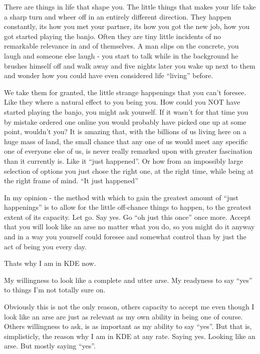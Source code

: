 

\noindent{}There are things in life that shape you. The little things that makes your life take a sharp turn and wheer off in an entirely different direction. 
They happen constantly, its how you met your partner, its how you got the new job, how you got started playing the banjo. Often they are tiny little incidents of no remarkable relevance in and of themselves. A man slips on the concrete, you laugh and someone else laugh - you start to talk while in the background he brushes himself off and walk away and five nights later you wake up next to them and wonder how you could have even considered life “living” before.

We take them for granted, the little strange happenings that you can’t foresee. Like they where a natural effect to you being you. How could you NOT have started playing the banjo, you might ask yourself. If it wasn’t for that time you by mistake ordered one online you would probably have picked one up at some point, wouldn’t you? 
It is amazing that, with the billions of us living here on a huge mass of land, the small chance that any one of us would meet any specific one of everyone else of us, is never really remarked upon with greater fascination than it currently is. Like it “just happened”.  Or how from an impossibly large selection of options you just chose the right one, at the right time, while being at the right frame of mind. “It just happened”

In my opinion - the method with which to gain the greatest amount of “just happenings” is to allow for the little off-chance things to happen, to the greatest extent of its capacity. Let go. Say yes. Go “oh just this once” once more. Accept that you will look like an arse no matter what you do, so you might do it anyway and in a way you yourself could foresee and somewhat control than by just the act of being you every day. 

Thats why I am in KDE now.

My willingness to look like a complete and utter arse. My readyness to say “yes” to things I’m not totally sure on.

Obviously this is not the only reason, others capacity to accept me even though I look like an arse are just as relevant as my own ability in being one of course. Others willingness to ask, is as important as my ability to say “yes”. But that is, simplisticly, the reason why I am in KDE at any rate. Saying yes. Looking like an arse. But mostly saying “yes”.

